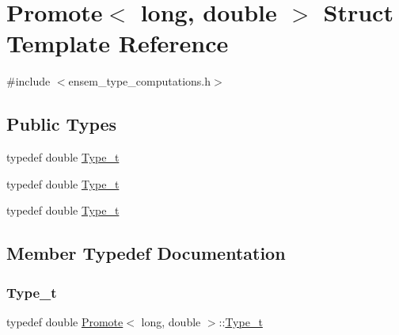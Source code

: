 \hypertarget{structPromote_3_01long_00_01double_01_4}{}\section{Promote$<$ long, double $>$ Struct Template Reference}
\label{structPromote_3_01long_00_01double_01_4}


{\ttfamily \#include $<$ensem\+\_\+type\+\_\+computations.\+h$>$}

\subsection*{Public Types}
\begin{DoxyCompactItemize}
\item 
typedef double \mbox{\hyperlink{structPromote_3_01long_00_01double_01_4_aab2bb863f5db06bd92f7818e53d06867}{Type\+\_\+t}}
\item 
typedef double \mbox{\hyperlink{structPromote_3_01long_00_01double_01_4_aab2bb863f5db06bd92f7818e53d06867}{Type\+\_\+t}}
\item 
typedef double \mbox{\hyperlink{structPromote_3_01long_00_01double_01_4_aab2bb863f5db06bd92f7818e53d06867}{Type\+\_\+t}}
\end{DoxyCompactItemize}


\subsection{Member Typedef Documentation}
\mbox{\label{structPromote_3_01long_00_01double_01_4_aab2bb863f5db06bd92f7818e53d06867}} 
\subsubsection{\texorpdfstring{Type\_t}{Type\_t}\hspace{0.1cm}{\footnotesize\ttfamily [1/3]}}
{\footnotesize\ttfamily typedef double \mbox{\hyperlink{structPromote}{Promote}}$<$ long, double $>$\+::\mbox{\hyperlink{structPromote_3_01long_00_01double_01_4_aab2bb863f5db06bd92f7818e53d06867}{Type\+\_\+t}}}

\mbox{\label{structPromote_3_01long_00_01double_01_4_aab2bb863f5db06bd92f7818e53d06867}} 
